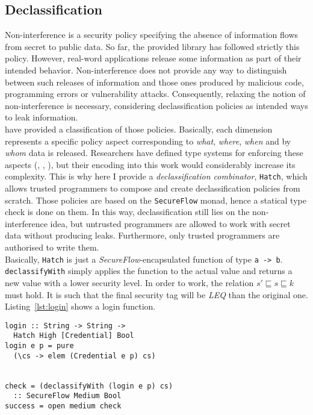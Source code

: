 \subsection{Declassification}
Non-interference is a security policy specifying the absence of information flows from secret to public data. So far, the provided library has followed strictly this policy. However, real-word applications release some information as part of their intended behavior. Non-interference does not provide any way to distinguish between such releases of information and those ones produced by malicious code, programming errors or vulnerability attacks. Consequently, relaxing the notion of non-interference is necessary, considering declassification policies as intended ways to leak information. \\
\citeauthor{sabelfeld2005dimensions} \cite{sabelfeld2005dimensions} have provided a classification of those policies. Basically, each dimension represents a specific policy aspect corresponding to \textit{what}, \textit{where}, \textit{when} and by \textit{whom} data is released. Researchers have defined type systems for enforcing these aspects (\cite{banerjee2008expressive}, \cite{zdancewic2001robust}, \cite{zdancewic2003type}), but their encoding into this work would considerably increase its complexity. This is why here I provide a \textit{declassification combinator}, \texttt{Hatch}, which allows trusted programmers to compose and create declassification policies from scratch. Those policies are based on the \texttt{SecureFlow} monad, hence a statical type check is done on them. In this way, declassification still lies on the non-interference idea, but untrusted programmers are allowed to work with secret data without producing leaks. Furthermore, only trusted programmers are authorised to write them. \\
Basically, \texttt{Hatch} is just a \textit{SecureFlow}-encapsulated function of type \texttt{a -> b}. \texttt{declassifyWith} simply applies the function to the actual value and returns a new value with a lower security level. In order to work, the relation $s' \sqsubseteq s \sqsubseteq k$ must hold. It is such that the final security tag will be \textit{LEQ} than the original one. \\
Listing~\ref{lst:login} shows a login function.
\begin{lstlisting}[caption={Declassificated login}, label={lst:login}]
login :: String -> String -> 
  Hatch High [Credential] Bool
login e p = pure
  (\cs -> elem (Credential e p) cs)


check = (declassifyWith (login e p) cs)
  :: SecureFlow Medium Bool
success = open medium check
\end{lstlisting}
